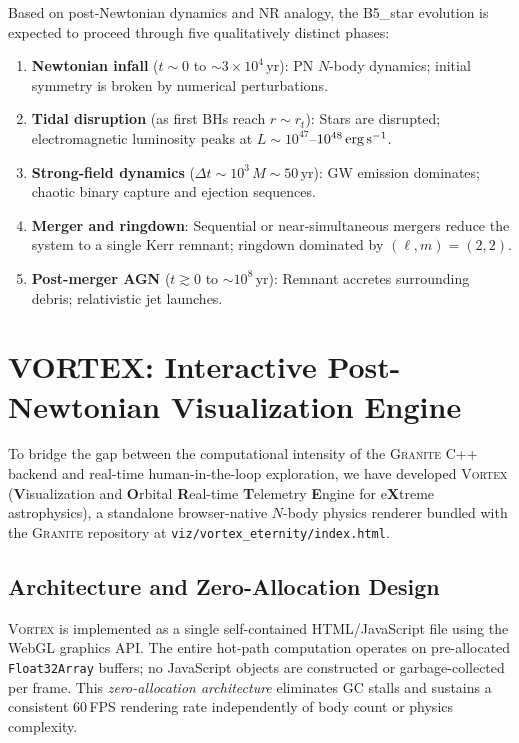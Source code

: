 \documentclass[aps,prd,twocolumn,superscriptaddress,nofootinbib,showpacs,
               longbibliography]{revtex4-2}
\newcommand{\granite}{\textsc{Granite}}
\newcommand{\code}[1]{\texttt{#1}}
\begin{document}
Based on post-Newtonian dynamics and NR analogy, the B5\_star evolution is
expected to proceed through five qualitatively distinct phases:
\begin{enumerate}[nosep]
  \item \textbf{Newtonian infall} ($t \sim 0$ to ${\sim}3\times10^4\,\text{yr}$):
    PN $N$-body dynamics; initial symmetry is broken by numerical perturbations.
  \item \textbf{Tidal disruption} (as first BHs reach $r \sim r_t$):
    Stars are disrupted; electromagnetic luminosity peaks at
    $L \sim 10^{47}$--$10^{48}\,\text{erg\,s}^{-1}$.
  \item \textbf{Strong-field dynamics}
    ($\Delta t \sim 10^3\,M \sim 50\,\text{yr}$):
    GW emission dominates; chaotic binary capture and ejection sequences.
  \item \textbf{Merger and ringdown}:
    Sequential or near-simultaneous mergers reduce the system to a single
    Kerr remnant; ringdown dominated by $(\ell,m) = (2,2)$.
  \item \textbf{Post-merger AGN} ($t \gtrsim 0$ to ${\sim}10^8\,\text{yr}$):
    Remnant accretes surrounding debris; relativistic jet launches.
\end{enumerate}

\section{VORTEX: Interactive Post-Newtonian Visualization Engine}
\label{sec:vortex}

To bridge the gap between the computational intensity of the \granite{}
C++ backend and real-time human-in-the-loop exploration, we have developed
\textsc{Vortex} (\textbf{V}isualization and \textbf{O}rbital
\textbf{R}eal-time \textbf{T}elemetry \textbf{E}ngine for e\textbf{X}treme
astrophysics), a standalone browser-native $N$-body physics renderer bundled
with the \granite{} repository at
\code{viz/vortex\_eternity/index.html}.

\subsection{Architecture and Zero-Allocation Design}
\label{sec:vortex_arch}

\textsc{Vortex} is implemented as a single self-contained HTML/JavaScript
file using the WebGL graphics API.
The entire hot-path computation operates on pre-allocated
\code{Float32Array} buffers; no JavaScript objects are constructed or
garbage-collected per frame.
This \emph{zero-allocation architecture} eliminates GC stalls and sustains
a consistent 60\,FPS rendering rate independently of body count or physics
complexity.
\end{document}
